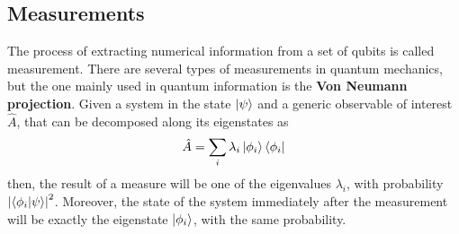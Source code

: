 \subsection{Measurements}
The process of extracting numerical information from a set of qubits is called measurement. There are several types of measurements in quantum mechanics, but the one mainly used in quantum information is the \textbf{Von Neumann projection}. Given a system in the state $\ket{\psi}$ and a generic observable of interest $\hat{A}$, that can be decomposed along its eigenstates as 
\[ \hat{A} = \sum_i\lambda_i\ket{\phi_i}\bra{\phi_i} \]
then, the result of a measure will be one of the eigenvalues $\lambda_i$, with probability $\abs{\bra{\phi_i}\ket{\psi}}^2$. Moreover, the state of the system immediately after the measurement will be exactly the eigenstate $\ket{\phi_i}$, with the same probability.
